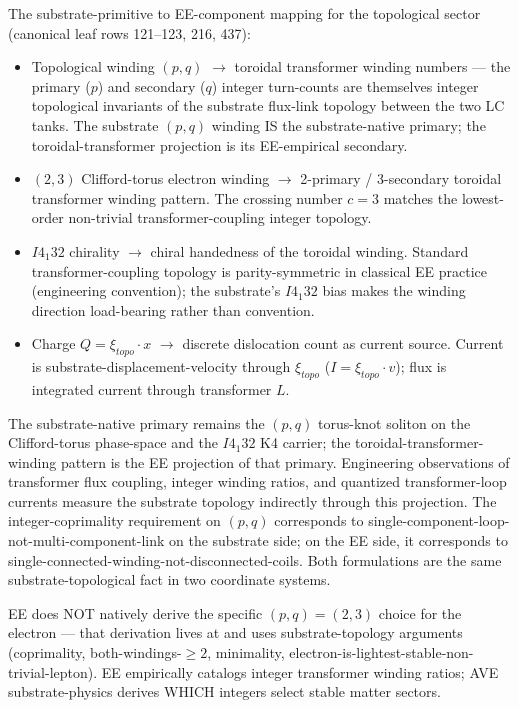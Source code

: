 The substrate-primitive to EE-component mapping for the topological sector (canonical leaf  rows 121--123, 216, 437):

\begin{itemize}
    \item Topological winding $(p, q)$ $\to$ toroidal transformer winding numbers --- the primary ($p$) and secondary ($q$) integer turn-counts are themselves integer topological invariants of the substrate flux-link topology between the two LC tanks. The substrate $(p, q)$ winding IS the substrate-native primary; the toroidal-transformer projection is its EE-empirical secondary.
    \item $(2, 3)$ Clifford-torus electron winding $\to$ 2-primary / 3-secondary toroidal transformer winding pattern. The crossing number $c = 3$ matches the lowest-order non-trivial transformer-coupling integer topology.
    \item $I4_1 32$ chirality $\to$ chiral handedness of the toroidal winding. Standard transformer-coupling topology is parity-symmetric in classical EE practice (engineering convention); the substrate's $I4_1 32$ bias makes the winding direction load-bearing rather than convention.
    \item Charge $Q = \xi_{topo} \cdot x$ $\to$ discrete dislocation count as current source. Current is substrate-displacement-velocity through $\xi_{topo}$ ($I = \xi_{topo} \cdot v$); flux is integrated current through transformer $L$.
\end{itemize}

The substrate-native primary remains the $(p, q)$ torus-knot soliton on the Clifford-torus phase-space and the $I4_1 32$ K4 carrier; the toroidal-transformer-winding pattern is the EE projection of that primary. Engineering observations of transformer flux coupling, integer winding ratios, and quantized transformer-loop currents measure the substrate topology indirectly through this projection. The integer-coprimality requirement on $(p, q)$ corresponds to single-component-loop-not-multi-component-link on the substrate side; on the EE side, it corresponds to single-connected-winding-not-disconnected-coils. Both formulations are the same substrate-topological fact in two coordinate systems.

EE does NOT natively derive the specific $(p, q) = (2, 3)$ choice for the electron --- that derivation lives at  and uses substrate-topology arguments (coprimality, both-windings-$\geq 2$, minimality, electron-is-lightest-stable-non-trivial-lepton). EE empirically catalogs integer transformer winding ratios; AVE substrate-physics derives WHICH integers select stable matter sectors.

